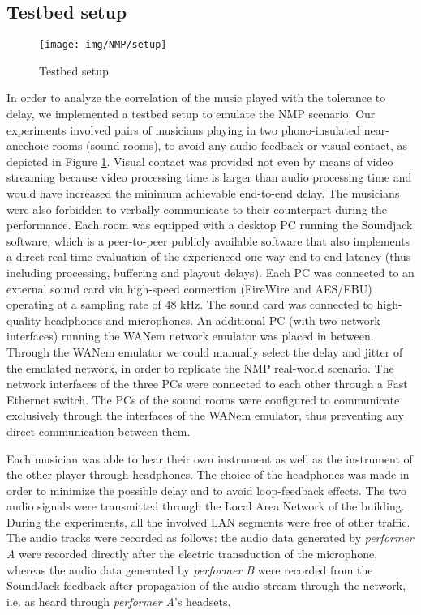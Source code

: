 \subsection{Testbed setup}\label{sec:NMP:testbed}
\begin{figure}[!tb]
  \centering
  \texttt{[image: img/NMP/setup]}
  \caption{Testbed setup}
 \label{fig:NMP:testbed}
\end{figure}
In order to analyze the correlation of the music played with the tolerance to delay, we implemented a testbed setup to emulate the NMP scenario. Our experiments involved pairs of musicians playing in two phono-insulated near-anechoic rooms (sound rooms), to avoid any audio feedback or visual contact, as depicted in Figure \ref{fig:NMP:testbed}. Visual contact was provided not even by means of video streaming because video processing time is larger than audio processing time and would have increased the minimum achievable end-to-end delay. The musicians were also forbidden to verbally communicate to their counterpart during the performance. Each room was equipped with a desktop PC running the Soundjack software, which is a peer-to-peer publicly available software \cite{carot2008distributed} that also implements a direct real-time evaluation of the experienced one-way end-to-end latency (thus including processing, buffering and playout delays).  Each PC was connected to an external sound card via high-speed connection (FireWire and AES/EBU) operating at a sampling rate of 48 kHz. The sound card was connected to high-quality headphones and microphones. An additional PC (with two network interfaces) running the WANem network emulator \cite{wanem} was placed in between. 
Through the WANem emulator we could manually select the delay and jitter of the emulated network, in order to replicate the NMP real-world scenario. The network interfaces of the three PCs were connected to each other through a Fast Ethernet switch. The PCs of the sound rooms were configured to communicate exclusively through the interfaces of the WANem emulator, thus preventing any direct communication between them. 

Each musician was able to hear their own instrument as well as the instrument of the other player through headphones. The choice of the headphones was made in order to minimize the possible delay and to avoid loop-feedback effects. The two audio signals were transmitted through the Local Area Network of the building. During the experiments, all the involved LAN segments were free of other traffic. The audio tracks were recorded as follows: the audio data generated by \textit{performer A} were recorded directly after the electric transduction of the microphone, whereas the audio data generated by \textit{performer B} were recorded from the SoundJack feedback after propagation of the audio stream through the network, i.e. as heard through \textit{performer A}'s headsets.

